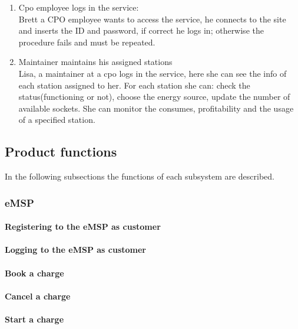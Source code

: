 \begin{enumerate}[label=S\arabic*]
      \item Cpo employee logs in the service:\\
            Brett a CPO employee wants to access the service, he connects to the site and inserts the ID
            and password, if correct he logs in; otherwise the procedure fails and must be repeated.
      \item Maintainer maintains his assigned stations\\
            Lisa, a maintainer at a cpo logs in the service, here she can see the info of each station assigned to her.
            For each station she can: check the status(functioning or not), choose the energy source, update the number of available sockets.
            She can monitor the consumes, profitability and the usage of a specified station.
\end{enumerate}

\subsection{Product functions}
In the following subsections the functions of each subsystem are described.


\subsubsection{\ac{eMSP}}
\paragraph{Registering to the \ac{eMSP} as customer}
\paragraph{Logging to the \ac{eMSP} as customer}
\paragraph{Book a charge}

\paragraph{Cancel a charge}

\paragraph{Start a charge}

